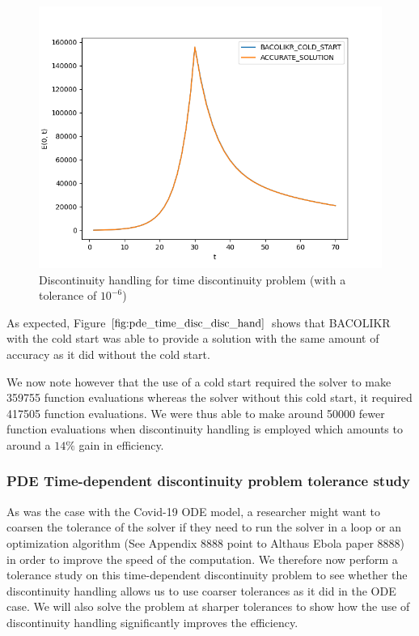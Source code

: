 \documentclass{article}
\begin{document}
\begin{figure}[H]
\centering
\includegraphics[width=0.7\linewidth]{./figures/pde_time_disc_disc_hand}
\caption{Discontinuity handling for time discontinuity problem (with a tolerance of $10^{-6}$)}
\label{fig:pde_time_disc_disc_hand}
\end{figure}

As expected, Figure $\ref{fig:pde_time_disc_disc_hand}$ shows that BACOLIKR with the cold start was able to provide a solution with the same amount of accuracy as it did without the cold start.

We now note however that the use of a cold start required the solver to make 359755 function evaluations whereas the solver without this cold start, it required 417505 function evaluations. We were thus able to make around 50000 fewer function evaluations when discontinuity handling is employed which amounts to around a $14\%$ gain in efficiency.

\subsubsection{PDE Time-dependent discontinuity problem tolerance study}
\label{subsubsection:pde_time_tol}

As was the case with the Covid-19 ODE model, a researcher might want to coarsen the tolerance of the solver if they need to run the solver in a loop or an optimization algorithm (See Appendix 8888 point to Althaus Ebola paper 8888) in order to improve the speed of the computation. We therefore now perform a tolerance study on this time-dependent discontinuity problem to see whether the discontinuity handling allows us to use coarser tolerances as it did in the ODE case. We will also solve the problem at sharper tolerances to show how the use of discontinuity handling significantly improves the efficiency.
\end{document}
